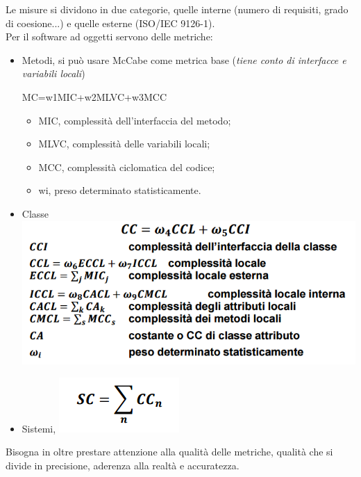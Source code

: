 Le misure si dividono in due categorie, quelle interne (numero di requisiti, grado di coesione...) e quelle esterne (ISO/IEC 9126-1).\\
Per il software ad oggetti servono delle metriche:
\begin{itemize}
	\item Metodi, si può usare McCabe come metrica base (\textit{tiene conto di interfacce e variabili locali})\\
	\begin{center}
		MC=w1MIC+w2MLVC+w3MCC
	\end{center}
	\begin{itemize}
		\item MIC, complessità dell'interfaccia del metodo;
		\item MLVC, complessità delle variabili locali;
		\item MCC, complessità ciclomatica del codice;
		\item wi, preso determinato statisticamente.
	\end{itemize}
	\item Classe \includegraphics[width=0.5\columnwidth]{img2} %
	\item Sistemi, \includegraphics[width=0.1\columnwidth]{img3} %
\end{itemize}

Bisogna in oltre prestare attenzione alla qualità delle metriche, qualità che si divide in precisione, aderenza alla realtà e accuratezza.
